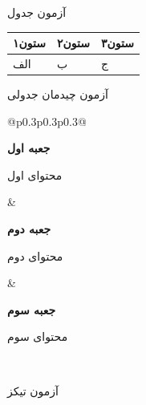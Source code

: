 \documentclass[aspectratio=169]{beamer}
\begin{document}
\begin{frame}{آزمون جدول}
\begin{tabular}{lll}
\toprule
ستون۱ & ستون۲ & ستون۳\\
\midrule
الف & ب & ج\\
\bottomrule
\end{tabular}
\end{frame}

\begin{frame}{آزمون چیدمان جدولی}
\begin{tabular}{@{}p{0.3\textwidth}p{0.3\textwidth}p{0.3\textwidth}@{}}
\begin{minipage}[t]{\linewidth}\textbf{جعبه اول}\par محتوای اول\end{minipage} &
\begin{minipage}[t]{\linewidth}\textbf{جعبه دوم}\par محتوای دوم\end{minipage} &
\begin{minipage}[t]{\linewidth}\textbf{جعبه سوم}\par محتوای سوم\end{minipage}\\
\end{tabular}
\end{frame}

\begin{frame}{آزمون تیکز}
\end{frame}
\end{document}
